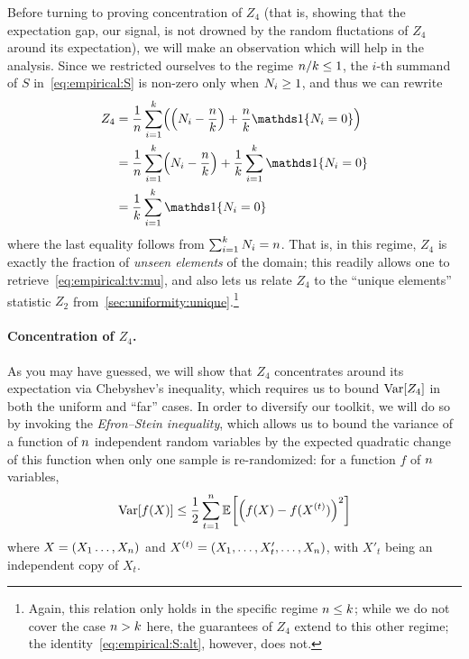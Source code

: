 Before turning to proving concentration of $Z_4$ (that is, showing that the expectation gap, our signal, is not drowned by the random fluctations of $Z_4$ around its expectation), we will make an observation which will help in the analysis. Since we restricted ourselves to the regime $n/k\leq 1$, the $i$-th summand of $S$ in~\cref{eq:empirical:S} is non-zero only when $N_i\geq 1$, and thus we can rewrite
\begin{align}
  Z_4
  &= \frac{1}{\ns} \sum_{i=1}^\ab \Paren{ \Paren{ \occur_i - \frac{\ns}{\ab} } +  \frac{\ns}{\ab} \indic{\occur_i = 0} } \notag\\
  &= \frac{1}{\ns} \sum_{i=1}^\ab \Paren{ \occur_i - \frac{\ns}{\ab} } + \frac{1}{\ab} \sum_{i=1}^\ab \indic{\occur_i = 0} \notag\\
  &= \frac{1}{\ab} \sum_{i=1}^\ab \indic{\occur_i = 0} \label{eq:empirical:S:alt}
\end{align}
where the last equality follows from $\sum_{i=1}^k N_i = n$. 
That is, in this regime, $Z_4$ is exactly the fraction of \emph{unseen elements} of the domain; this readily allows one to retrieve~\cref{eq:empirical:tv:mu}, and also lets us relate $Z_4$ to the ``unique elements'' statistic $Z_2$ from~\cref{sec:uniformity:unique}.\footnote{Again, this relation only holds in the specific regime $n \leq k$; while we do not cover the case $n > k$ here, the guarantees of $Z_4$ extend to this other regime; the identity~\cref{eq:empirical:S:alt}, however, does not.}

\paragraph{Concentration of $Z_4$.} As you may have guessed, we will show that $Z_4$ concentrates around its expectation via Chebyshev's inequality, which requires us to bound $\operatorname{Var}[Z_4]$ in both the uniform and ``far'' cases. In order to diversify our toolkit, we will do so by invoking the \emph{Efron--Stein inequality}, which allows us to bound the variance of a function of $n$ independent random variables by the expected quadratic change of this function when only one sample is re-randomized: for a function $f$ of $n$ variables,
\begin{align}
    \Var[ f(X)]  \leq \frac{1}{2} \sum_{t=1}^\ns \bEE{ \Paren{ f(X) - f(X^{(t)}) }^2 }
\end{align}
where $X=(X_1\dots,X_n)$ and $X^{(t)} = (X_1,\dots, X'_t, \dots, X_n)$, with $X'_t$ being an independent copy of $X_t$.

